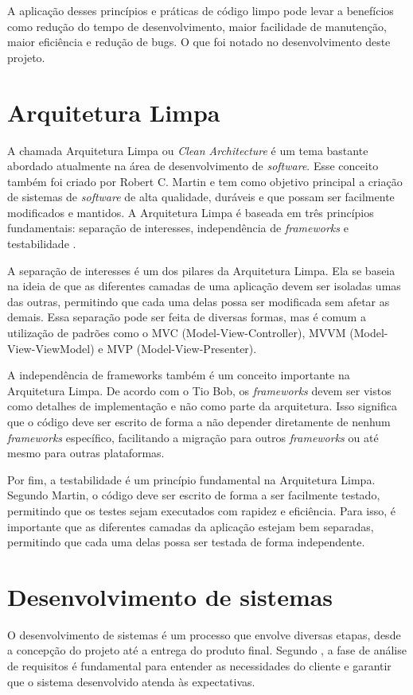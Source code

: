 A aplicação desses princípios e práticas de código limpo pode levar a benefícios como redução do tempo de desenvolvimento, maior facilidade de manutenção, maior eficiência e redução de bugs. O que foi notado no desenvolvimento deste projeto.


\section{Arquitetura Limpa}\label{sec:arquitetura_limpa}
A chamada Arquitetura Limpa ou \textit{Clean Architecture} é um tema bastante abordado atualmente na área de desenvolvimento de \textit{software}. Esse conceito também foi criado por Robert C. Martin e tem como objetivo principal a criação de sistemas de \textit{software} de alta qualidade, duráveis e que possam ser facilmente modificados e mantidos. A Arquitetura Limpa é baseada em três princípios fundamentais: separação de interesses, independência de \textit{frameworks} e testabilidade \cite{martin2018arquitetura}.

A separação de interesses é um dos pilares da Arquitetura Limpa. Ela se baseia na ideia de que as diferentes camadas de uma aplicação devem ser isoladas umas das outras, permitindo que cada uma delas possa ser modificada sem afetar as demais. Essa separação pode ser feita de diversas formas, mas é comum a utilização de padrões como o MVC (Model-View-Controller), MVVM (Model-View-ViewModel) e MVP (Model-View-Presenter).

A independência de frameworks também é um conceito importante na Arquitetura Limpa. De acordo com o Tio Bob, os \textit{frameworks} devem ser vistos como detalhes de implementação e não como parte da arquitetura. Isso significa que o código deve ser escrito de forma a não depender diretamente de nenhum \textit{frameworks} específico, facilitando a migração para outros \textit{frameworks} ou até mesmo para outras plataformas.

Por fim, a testabilidade é um princípio fundamental na Arquitetura Limpa. Segundo Martin, o código deve ser escrito de forma a ser facilmente testado, permitindo que os testes sejam executados com rapidez e eficiência. Para isso, é importante que as diferentes camadas da aplicação estejam bem separadas, permitindo que cada uma delas possa ser testada de forma independente.

\section{Desenvolvimento de sistemas}\label{sec:dev_sistemas}
O desenvolvimento de sistemas é um processo que envolve diversas etapas, desde a concepção do projeto até a entrega do produto final. Segundo \cite{pressman2016engenharia}, a fase de análise de requisitos é fundamental para entender as necessidades do cliente e garantir que o sistema desenvolvido atenda às expectativas. 

